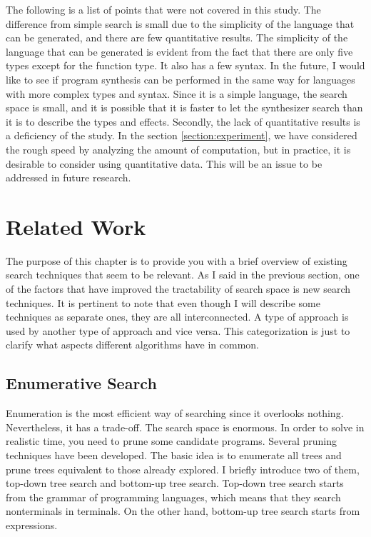 \documentclass[12pt, a4paper, titlepage]{report}
\begin{document}
  The following is a list of points that were not covered in this study.
  The difference from simple search is small due to the simplicity of the language that can be generated, and there are few quantitative results.
  The simplicity of the language that can be generated is evident from the fact that there are only five types except for the function type.
  It also has a few syntax.
  In the future, I would like to see if program synthesis can be performed in the same way for languages with more complex types and syntax.
  Since it is a simple language, the search space is small, and it is possible that it is faster to let the synthesizer search than it is to describe the types and effects.
  Secondly, the lack of quantitative results is a deficiency of the study.
  In the section \ref{section:experiment}, we have considered the rough speed by analyzing the amount of computation, but in practice, it is desirable to consider using quantitative data.
  This will be an issue to be addressed in future research.

\chapter{Related Work}\label{chapter:relatedWork}
  The purpose of this chapter is to provide you with a brief overview of existing search techniques that seem to be relevant. As I said in the previous section, one of the factors that have improved the tractability of search space is new search techniques.
  It is pertinent to note that even though I will describe some techniques as separate ones, they are all interconnected. A type of approach is used by another type of approach and vice versa. This categorization is just to clarify what aspects different algorithms have in common.

  \section{Enumerative Search}
  Enumeration is the most efficient way of searching since it overlooks nothing.
  Nevertheless, it has a trade-off.
  The search space is enormous.
  In order to solve in realistic time, you need to prune some candidate programs.
  Several pruning techniques have been developed.
  The basic idea is to enumerate all trees and prune trees equivalent to those already explored.
  I briefly introduce two of them, top-down tree search and bottom-up tree search.
  Top-down tree search starts from the grammar of programming languages, which means that they search nonterminals in terminals.
  On the other hand, bottom-up tree search starts from expressions.
\end{document}

